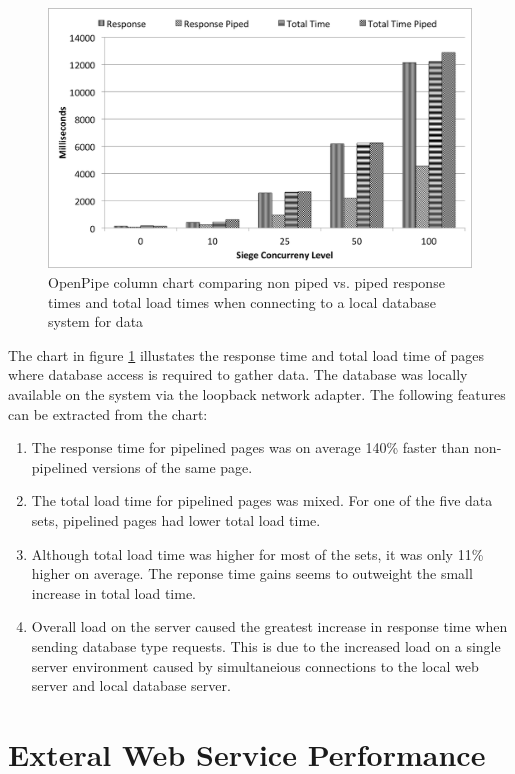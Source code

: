 \documentclass[12pt]{report}
\begin{document}
\begin{figure}[H]
\centering
\includegraphics[width=\textwidth,keepaspectratio]{figures/images/analysis_chart_database.png}
\caption{OpenPipe column chart comparing non piped vs. piped response times and total load times when connecting to a local database system for data}
\label{fig:analysisChartDatabase}
\end{figure}

The chart in figure \ref{fig:analysisChartDatabase} illustates the response time and total load time of pages where database access is required to gather data. The database was locally available on the system via the loopback network adapter. The following features can be extracted from the chart:

\begin{enumerate}
	\item The response time for pipelined pages was on average 140\% faster than non-pipelined versions of the same page.
	\item The total load time for pipelined pages was mixed. For one of the five data sets, pipelined pages had lower total load time.
	\item Although total load time was higher for most of the sets, it was only 11\% higher on average. The reponse time gains seems to outweight the small increase in total load time.
	\item Overall load on the server caused the greatest increase in response time when sending database type requests. This is due to the increased load on a single server environment caused by simultaneious connections to the local web server and local database server. 
\end{enumerate}


\section{Exteral Web Service Performance}
\end{document}

